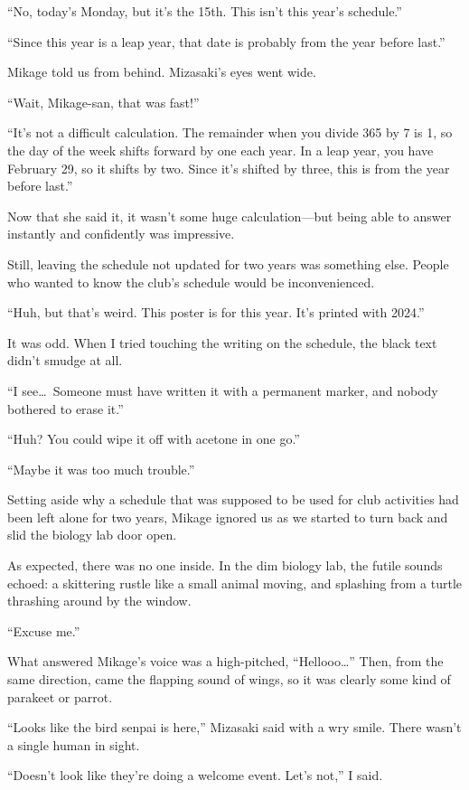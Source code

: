 \documentclass[
    a4paper,
    12pt,
    twoside,
    openany,
    UTF8,
    fontset=windows
]{ctexbook}
\begin{document}
``No, today's Monday, but it's the 15th. This isn't this year's schedule.''

``Since this year is a leap year, that date is probably from the year before last.''

Mikage told us from behind. Mizasaki's eyes went wide.

``Wait, Mikage-san, that was fast!''

``It's not a difficult calculation. The remainder when you divide 365 by 7 is 1, so the day of the week shifts forward by one each year. In a leap year, you have February 29, so it shifts by two. Since it's shifted by three, this is from the year before last.''

Now that she said it, it wasn't some huge calculation---but being able to answer instantly and confidently was impressive.

Still, leaving the schedule not updated for two years was something else. People who wanted to know the club's schedule would be inconvenienced.

``Huh, but that's weird. This poster is for this year. It's printed with 2024.''

It was odd. When I tried touching the writing on the schedule, the black text didn't smudge at all.

``I see\dots\ Someone must have written it with a permanent marker, and nobody bothered to erase it.''

``Huh? You could wipe it off with acetone in one go.''

``Maybe it was too much trouble.''

Setting aside why a schedule that was supposed to be used for club activities had been left alone for two years, Mikage ignored us as we started to turn back and slid the biology lab door open.

As expected, there was no one inside. In the dim biology lab, the futile sounds echoed: a skittering rustle like a small animal moving, and splashing from a turtle thrashing around by the window.

``Excuse me.''

What answered Mikage's voice was a high-pitched, ``Hellooo\dots'' Then, from the same direction, came the flapping sound of wings, so it was clearly some kind of parakeet or parrot.

``Looks like the bird senpai is here,'' Mizasaki said with a wry smile. There wasn't a single human in sight.

``Doesn't look like they're doing a welcome event. Let's not,'' I said.
\end{document}
